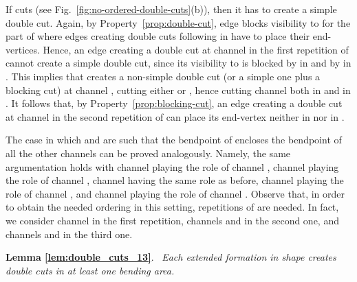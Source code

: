 \documentclass[a4paper,10pt]{llncs}
\newcounter{prop}
\renewenvironment{proof}
{{\bf Proof:}}{\hspace*{\fill}\par\vspace{2mm}}
\newcommand{\rephrase}[3]{\noindent\textbf{#1 #2}.~\emph{#3}}
\begin{document}
\begin{proof}
If  cuts  (see Fig.~\ref{fig:no-ordered-double-cuts}(b)), then it has to create a simple double cut. Again, by Property~\ref{prop:double-cut}, edge  blocks visibility to  for the part of  where edges creating double cuts following  in  have to place their end-vertices. Hence, an edge  creating a double cut at channel  in the first repetition of  cannot create a simple double cut, since its visibility to  is blocked by  in  and by  in . This implies that  creates a non-simple double cut (or a simple one plus a blocking cut) at channel , cutting either  or , hence cutting channel  both in  and in . It follows that, by Property~\ref{prop:blocking-cut}, an edge  creating a double cut at channel  in the second repetition of  can place its end-vertex neither in  nor in .

The case in which  and  are such that the bendpoint of  encloses the bendpoint of all the other channels can be proved analogously. Namely, the same argumentation holds with channel  playing the role of channel , channel  playing the role of channel , channel  having the same role as before, channel  playing the role of channel , and channel  playing the role of channel . Observe that, in order to obtain the needed ordering in this setting,  repetitions of  are needed. In fact, we consider channel  in the first repetition, channels  and  in the second one, and channels  and  in the third one.
\end{proof}

\rephrase{Lemma}{\ref{lem:double_cuts_13}}{
Each extended formation in shape   creates double cuts in at least one bending area.
}
\end{document}

